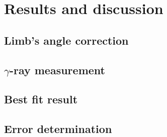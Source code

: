 \chapter{Results and discussion}


\section{Limb's angle correction}


\section{$\gamma$-ray measurement}


\section{Best fit result}


\section{Error determination}

